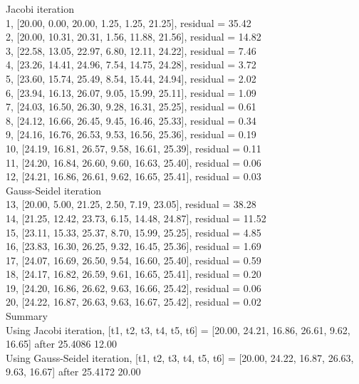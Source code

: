 \documentclass[11pt]{article}
\begin{document}
Jacobi iteration \\
1, [20.00, 0.00, 20.00, 1.25, 1.25, 21.25], residual = 35.42 \\
2, [20.00, 10.31, 20.31, 1.56, 11.88, 21.56], residual = 14.82 \\
3, [22.58, 13.05, 22.97, 6.80, 12.11, 24.22], residual = 7.46 \\
4, [23.26, 14.41, 24.96, 7.54, 14.75, 24.28], residual = 3.72 \\
5, [23.60, 15.74, 25.49, 8.54, 15.44, 24.94], residual = 2.02 \\
6, [23.94, 16.13, 26.07, 9.05, 15.99, 25.11], residual = 1.09 \\
7, [24.03, 16.50, 26.30, 9.28, 16.31, 25.25], residual = 0.61 \\
8, [24.12, 16.66, 26.45, 9.45, 16.46, 25.33], residual = 0.34 \\
9, [24.16, 16.76, 26.53, 9.53, 16.56, 25.36], residual = 0.19 \\
10, [24.19, 16.81, 26.57, 9.58, 16.61, 25.39], residual = 0.11 \\
11, [24.20, 16.84, 26.60, 9.60, 16.63, 25.40], residual = 0.06 \\
12, [24.21, 16.86, 26.61, 9.62, 16.65, 25.41], residual = 0.03 \\
Gauss-Seidel iteration \\
13, [20.00, 5.00, 21.25, 2.50, 7.19, 23.05], residual = 38.28 \\
14, [21.25, 12.42, 23.73, 6.15, 14.48, 24.87], residual = 11.52 \\
15, [23.11, 15.33, 25.37, 8.70, 15.99, 25.25], residual = 4.85 \\
16, [23.83, 16.30, 26.25, 9.32, 16.45, 25.36], residual = 1.69 \\
17, [24.07, 16.69, 26.50, 9.54, 16.60, 25.40], residual = 0.59 \\
18, [24.17, 16.82, 26.59, 9.61, 16.65, 25.41], residual = 0.20 \\
19, [24.20, 16.86, 26.62, 9.63, 16.66, 25.42], residual = 0.06 \\
20, [24.22, 16.87, 26.63, 9.63, 16.67, 25.42], residual = 0.02 \\
Summary \\
Using Jacobi iteration, [t1, t2, t3, t4, t5, t6] = [20.00, 24.21, 16.86, 26.61, 9.62, 16.65] after 25.4086 12.00 \\
Using Gauss-Seidel iteration, [t1, t2, t3, t4, t5, t6] = [20.00, 24.22, 16.87, 26.63, 9.63, 16.67] after 25.4172 20.00
\end{document}
